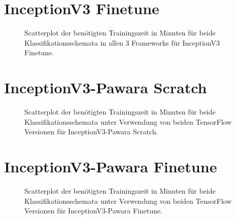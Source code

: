 \section{InceptionV3 Finetune}
\begin{figure}[H]
\hspace*{-1.5cm}

\caption{Scatterplot der benötigten Trainingszeit in Minuten für beide Klassifikationsschemata in allen 3 Frameworks für InceptionV3 Finetune.}
\label{fig:ScatterplotIF-dauer}
\end{figure}%
\newpage%
\section{InceptionV3-Pawara Scratch}
\begin{figure}[H]
\hspace*{-1.5cm}

\caption{Scatterplot der benötigten Trainingszeit in Minuten für beide Klassifikationsschemata unter Verwendung von beiden TensorFlow \cite{tensorflow} Versionen für InceptionV3-Pawara Scratch.}
\label{fig:ScatterplotIPS-dauer}
\end{figure}%
\newpage%
\section{InceptionV3-Pawara Finetune}
\begin{figure}[H]
\hspace*{-1.5cm}

\caption{Scatterplot der benötigten Trainingszeit in Minuten für beide Klassifikationsschemata unter Verwendung von beiden TensorFlow \cite{tensorflow} Versionen für InceptionV3-Pawara Finetune.}
\label{fig:ScatterplotIPF-dauer}
\end{figure}%
\newpage\null\newpage%